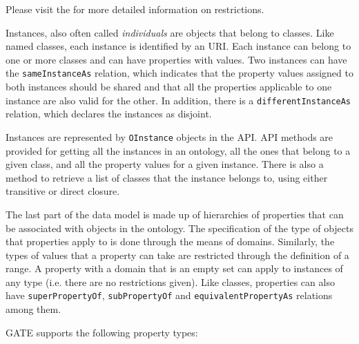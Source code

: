 Please visit the  for more
detailed information on restrictions.



Instances, also often called \emph{individuals} are objects that belong 
to classes. Like named classes, each
instance is identified by an URI. Each instance can belong to one or more
classes and can have properties with values. 
Two instances can  have the \texttt{sameInstanceAs} relation, which
indicates that the property values assigned to both instances should
be shared and that all the properties applicable to one instance are
also valid for the other. In addition, there is a \texttt{differentInstanceAs}
relation, which declares the instances as disjoint.

Instances are represented by \texttt{OInstance} objects in the API.
API methods are provided
for getting all the instances in an ontology, all the ones that belong to
a given class, and all the property values for a given instance. There
is also a method to retrieve a list of classes that the instance
belongs to, using either transitive or direct closure. 



The last part of the data model is made up of hierarchies of
properties that can be associated with objects in the ontology. 
The specification of the type of objects that properties apply
to is done through the means of domains. Similarly, the types of
values that a property can take are restricted through the definition
of a range. A property with a domain that is an empty set can apply to
instances of any type (i.e. there are no restrictions given). Like
classes, properties can also have \texttt{superPropertyOf}, \texttt{subPropertyOf} and
\texttt{equivalentPropertyAs} relations among them.

GATE supports the following property types:

